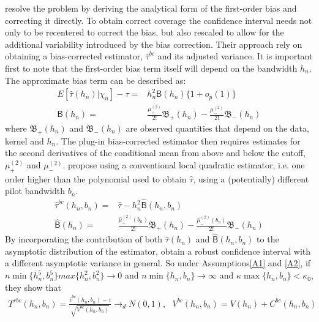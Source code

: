 \documentclass[12pt,fleqn]{article}
\begin{document}
\cite{calonico2014} resolve the problem by deriving the analytical form of the 
first-order bias and correcting it directly. To obtain correct coverage the 
confidence interval needs not only to be recentered to correct the bias, but 
also rescaled to allow for the additional variability introduced by the bias 
correction. Their approach rely on obtaining a bias-corrected  estimator, 
$\hat{\tau}^{bc}$ and its adjusted variance. It is important first to note that 
the first-order bias term itself will depend on the bandwidth $h_{n}$. The 
approximate bias term can be described as:
\begin{align*}
     E[\hat{\tau}(h_{n})|\chi_{n}]-\tau=& h_{n}^{2}\mathsf{B}(h_{n})\{1+o_{p}(1)\}\\
     \mathsf{B}(h_{n})=&\frac{\mu_{+}^{(2)}}{2!}\mathfrak{B}_{+}(h_{n})-\frac{\mu_{-}^{(2)}}{2!}\mathfrak{B}_{-}(h_{n})
   \end{align*}
where $\mathfrak{B}_{+}(h_{n})$ and $\mathfrak{B}_{-}(h_{n})$ are observed 
quantities that depend on the data, kernel and $h_{n}$. The plug-in 
bias-corrected estimator then requires estimates for the second derivatives of 
the conditional mean from above and below the cutoff, $\mu_{+}^{(2)}$ and 
$\mu_{-}^{(2)}$. \cite{calonico2014} propose using a conventional local quadratic
estimator, i.e. one order higher than the polynomial used to obtain $\hat{\tau}$,
using a (potentially) different pilot bandwidth $b_{n}$.
\begin{align*}
     \hat{\tau}^{bc}(h_{n}, b_{n})=& \hat{\tau}-h_{n}^{2}\hat{\mathsf{B}}(h_{n},b_{n})\\
     \hat{\mathsf{B}}(h_{n})=&\frac{\hat{\mu}_{+}^{(2)}(b_{n})}{2!}
     \mathfrak{B}_{+}(h_{n})-\frac{\hat{\mu}_{-}^{(2)}(b_{n})}{2!}\mathfrak{B}_{-}(h_{n})
   \end{align*}
By incorporating the contribution of both $\hat{\tau}(h_{n})$ and 
$\hat{\mathsf{B}}(h_{n},b_{n})$ to the asymptotic distribution of the estimator,
\cite{calonico2014} obtain a robust confidence interval with a different 
asymptotic variance in general. So under Assumptions\ref{A1} and \ref{A2}, if 
$n\min\{h_{n}^{5}, b_{n}^{5}\}max\{h_{n}^{2}, b_{n}^{2}\}\rightarrow 0$ and 
$n\min\{h_{n}, b_{n}\}\rightarrow \infty$ and $\kappa \max\{h_{n},b_{n}\}< 
\kappa_{0}$, they show that
\begin{align}
  T^{rbc}(h_{n}, b_{n})=\frac{\hat{\tau}^{bc}(h_{n}, b_{n})-\tau}{\sqrt{V^{bc}(h_{n}, b_{n})}}\rightarrow_{d}N(0,1),
  \text{        }V^{bc}(h_{n}, b_{n})=V(h_{n})+C^{bc}(h_{n}, b_{n})\\
 \end{align}
\end{document}
